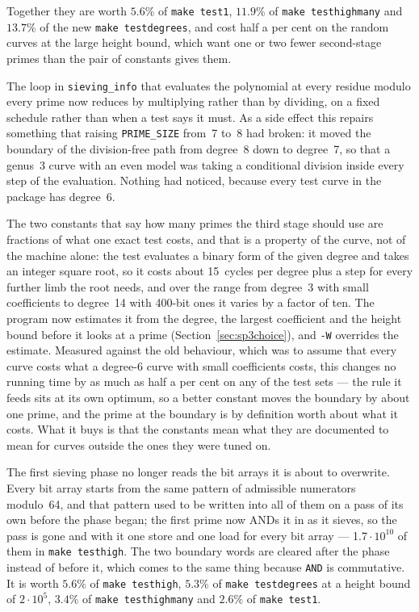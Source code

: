\documentclass[12pt,a4paper,oneside]{amsart}
\begin{document}
Together they are worth $5.6\%$ of \texttt{make test1}, $11.9\%$ of
\texttt{make testhighmany} and $13.7\%$ of the new \texttt{make testdegrees},
and cost half a per cent on the random curves at the large height bound,
which want one or two fewer second-stage primes than the pair of constants
gives them.

The loop in \texttt{sieving\_info} that evaluates the polynomial at every
residue modulo every prime now reduces by multiplying rather than by
dividing, on a fixed schedule rather than when a test says it must. As a
side effect this repairs something that raising \texttt{PRIME\_SIZE} from~7
to~8 had broken: it moved the boundary of the division-free path from
degree~8 down to degree~7, so that a genus~3 curve with an even model was
taking a conditional division inside every step of the evaluation. Nothing
had noticed, because every test curve in the package has degree~6.

The two constants that say how many primes the third stage should use are
fractions of what one exact test costs, and that is a property of the curve,
not of the machine alone: the test evaluates a binary form of the given
degree and takes an integer square root, so it costs about 15~cycles per
degree plus a step for every further limb the root needs, and over the range
from degree~3 with small coefficients to degree~14 with 400-bit ones it
varies by a factor of ten. The program now estimates it from the degree, the
largest coefficient and the height bound before it looks at a prime
(Section~\ref{sec:sp3choice}), and \verb+-W+ overrides the estimate.
Measured against the old behaviour, which was to assume that every curve
costs what a degree-6 curve with small coefficients costs, this changes no
running time by as much as half a per cent on any of the test sets --- the
rule it feeds sits at its own optimum, so a better constant moves the
boundary by about one prime, and the prime at the boundary is by definition
worth about what it costs. What it buys is that the constants mean what they
are documented to mean for curves outside the ones they were tuned on.

The first sieving phase no longer reads the bit arrays it is about to
overwrite. Every bit array starts from the same pattern of admissible
numerators modulo~64, and that pattern used to be written into all of them on
a pass of its own before the phase began; the first prime now ANDs it in as
it sieves, so the pass is gone and with it one store and one load for every
bit array --- 1.7\,$\cdot\,10^{10}$ of them in \texttt{make testhigh}. The
two boundary words are cleared after the phase instead of before it, which
comes to the same thing because \texttt{AND} is commutative. It is
worth $5.6\%$ of \texttt{make testhigh}, $5.3\%$ of \texttt{make
testdegrees} at a height bound of $2\cdot10^5$, $3.4\%$ of \texttt{make
testhighmany} and $2.6\%$ of \texttt{make test1}.
\end{document}
